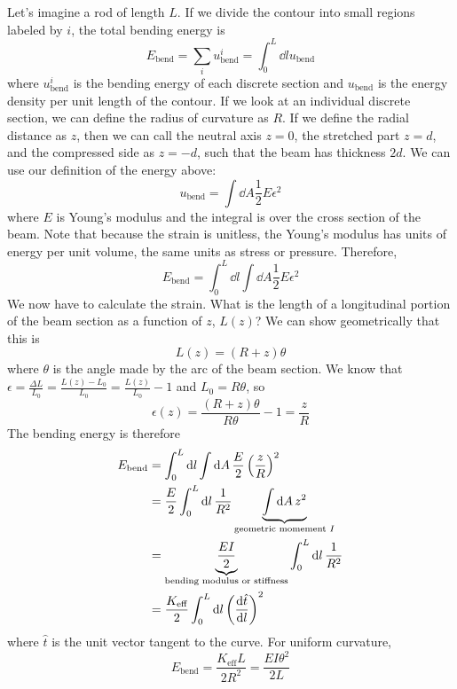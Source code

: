 \documentclass[a4paper,twoside,master.tex]{subfiles}
\begin{document}
Let's imagine a rod of length $ L $. If we divide the contour into small regions labeled by $ i $, the total bending energy is
\begin{equation}
    E_{\text{bend}} = \sum_i u^i_{\text{bend}} = \int_0^L \dd{l} u_{\text{bend}}
\end{equation}
where $ u^i_{\text{bend}} $ is the bending energy of each discrete section and $ u_{\text{bend}} $ is the energy density per unit length of the contour. If we look at an individual discrete section, we can define the radius of curvature as $ R $. If we define the radial distance as $ z $, then we can call the neutral axis $ z = 0 $, the stretched part $ z = d $, and the compressed side as $ z = -d $, such that the beam has thickness $ 2d $. We can use our definition of the energy above:
\begin{equation}
    u_{\text{bend}} = \int \dd{A} \frac{1}{2} E \epsilon^2
\end{equation}
where $ E $ is Young's modulus and the integral is over the cross section of the beam. Note that because the strain is unitless, the Young's modulus has units of energy per unit volume, the same units as stress or pressure. Therefore,
\begin{equation}
    E_{\text{bend}} = \int_0^L \dd{l} \int \dd{A} \frac{1}{2} E \epsilon^2
\end{equation}
We now have to calculate the strain. What is the length of a longitudinal portion of the beam section as a function of $ z $, $ L(z) $? We can show geometrically that this is
\begin{equation}
    L(z) = (R + z) \theta
\end{equation}
where $ \theta $ is the angle made by the arc of the beam section. We know that $ \epsilon = \frac{\Delta L}{L_0} = \frac{L(z) - L_0}{L_0} = \frac{L(z)}{L_0} - 1 $ and $ L_0 = R \theta $, so
\begin{equation}
    \epsilon(z) = \frac{(R + z) \theta}{R \theta} - 1 = \frac{z}{R}
\end{equation}
The bending energy is therefore
\begin{align}
    E_{\text{bend}} &= \int_0^L \dd{l} \int \dd{A} \frac{E}{2} \left( \frac{z}{R} \right)^2 \\
                    &= \frac{E}{2} \int_0^L \dd{l} \frac{1}{R^2} \underbrace{\int \dd{A} z^2}_{\text{geometric momement } I} \\
                    &= \underbrace{\frac{EI}{2}}_{\text{bending modulus or stiffness}} \int_0^L \dd{l} \frac{1}{R^2} \\
                    &= \frac{K_{\text{eff}}}{2} \int_0^L \dd{l} \left( \dv{\hat{t}}{l} \right)^2
\end{align}
where $ \hat{t} $ is the unit vector tangent to the curve. For uniform curvature,
\begin{equation}
    E_{\text{bend}} = \frac{K_{\text{eff}} L}{2 R^2} = \frac{E I \theta^2}{2L}
\end{equation}
\end{document}
